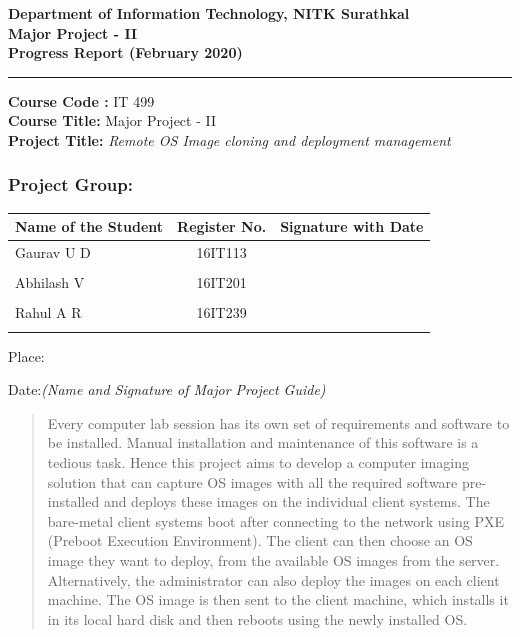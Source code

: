 \documentclass[a4paper,12pt]{article}
\begin{document}
\begin{center}
\textbf{\large{Department of Information Technology, NITK Surathkal}} \\

\textbf{\large{Major Project - II}} \\
\textbf{\large{Progress Report (February 2020)}} \\
\noindent\rule{12cm}{0.4pt}
\end{center}


\noindent
\textbf{Course Code :} IT 499 \\
\textbf{Course Title:} Major Project - II \\
\textbf{Project Title:} \emph{Remote OS Image cloning and  deployment management}   %

\subsubsection*{Project Group:}
\begin{tabular}{lcl}
\hline                         %
Name of the Student & Register No. & Signature with Date             \\
\hline
Gaurav U D            &16IT113        &                            \\\\
Abhilash V            &16IT201        &                            \\\\
Rahul A R            &16IT239        &                            \\\\
\hline
\end{tabular} 

\vspace{5 em}

Place:

Date:\hfill \textit{(Name and Signature of Major Project Guide)}




\newpage
         \begin{abstract}
Every computer lab session has its own set of requirements and software to be installed. Manual installation and maintenance of this software is a tedious task. Hence this project aims to develop a computer imaging solution that can capture OS images with all the required software pre-installed and deploys these images on the individual client systems.
The bare-metal client systems boot after connecting to the network using PXE (Preboot Execution Environment). The client can then choose an OS image they want to deploy,  from the available OS images from the server. Alternatively, the administrator can also deploy the images on each client machine. The OS image is then sent to the client machine, which installs it in its local hard disk and then reboots using the newly installed OS.



    \end{abstract}
\end{document}
